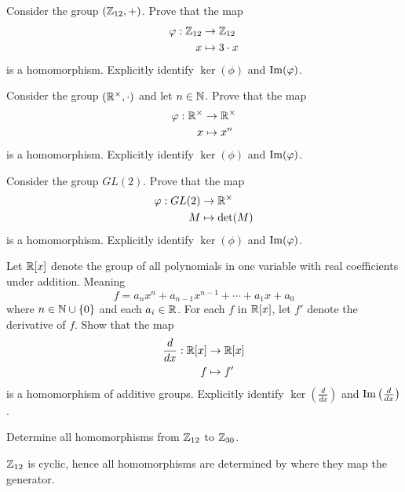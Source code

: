 \documentclass{ximera}
\begin{document}
\begin{exercise}
  Consider the group $(\mathbb Z_{12},+)$. Prove that the map
  \begin{align*}
    \varphi:\mathbb Z_{12} &\to \mathbb Z_{12}\\
    x &\mapsto 3\cdot x
  \end{align*}
  is a homomorphism. Explicitly identify $\ker(\phi)$ and
  $\operatorname{Im}(\varphi)$.
\end{exercise}



\begin{exercise}
  Consider the group $(\mathbb R^\times,\cdot)$ and let $n\in \mathbb N$. Prove that
  the map
  \begin{align*}
    \varphi:\mathbb R^\times &\to \mathbb R^\times\\
    x &\mapsto x^n
  \end{align*}
  is a homomorphism. Explicitly identify $\ker(\phi)$ and
  $\operatorname{Im}(\varphi)$.
\end{exercise}

\begin{exercise}
  Consider the group $GL(2)$. Prove that the map
  \begin{align*}
    \varphi:GL(2) &\to \mathbb R^\times\\
    M &\mapsto \det(M)
  \end{align*}
  is a homomorphism. Explicitly identify $\ker(\phi)$ and
  $\operatorname{Im}(\varphi)$.
\end{exercise}



\begin{exercise}
  Let $\mathbb R[x]$ denote the group of all polynomials in one variable with
  real coefficients under addition. Meaning
  \[
  f = a_n x^{n} + a_{n-1}x^{n-1} + \cdots + a_1x + a_0
  \]
  where $n\in\mathbb N\cup\{0\}$ and each $a_i\in\mathbb R$.  For each $f$ in $\mathbb R[x]$,
  let $f'$ denote the derivative of $f$. Show that the map
  \begin{align*}
    \frac{d}{dx}:\mathbb R[x]&\to\mathbb R[x]\\
    f  &\mapsto f'
  \end{align*}
  is a homomorphism of additive groups. Explicitly identify
  $\ker\left(\frac{d}{dx}\right)$ and $\operatorname{Im}\left(\frac{d}{dx}\right)$.
\end{exercise}



\begin{exercise}
  Determine all homomorphisms from $\mathbb Z_{12}$ to $\mathbb Z_{30}$.
  \begin{hint}
    $\mathbb Z_{12}$ is cyclic, hence all homomorphisms are determined by
    where they map the generator.
  \end{hint}
\end{exercise}
\end{document}
